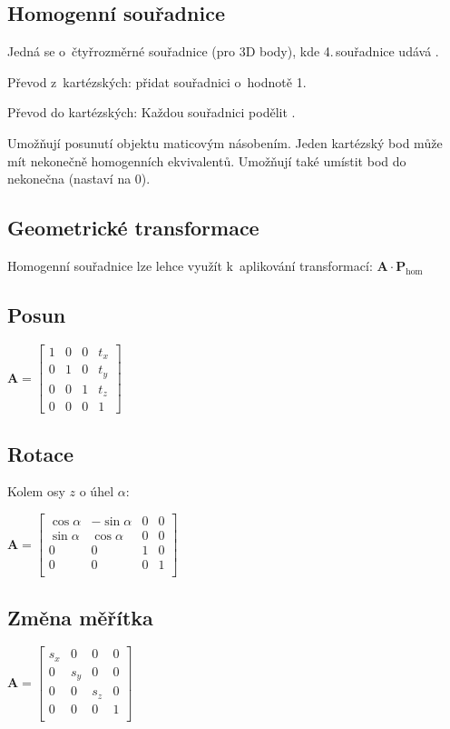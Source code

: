 \subsection{Homogenní souřadnice}
Jedná se o~čtyřrozměrné souřadnice (pro 3D body), kde 4.\,souřadnice udává .

Převod z~kartézských: přidat souřadnici o~hodnotě 1.

Převod do kartézských: Každou souřadnici podělit .

Umožňují posunutí objektu maticovým násobením. Jeden kartézský bod může mít nekonečně homogenních ekvivalentů. Umožňují také umístit bod do nekonečna (nastaví  na 0).

\subsection{Geometrické transformace}

Homogenní souřadnice lze lehce využít k~aplikování transformací: \(\mathbf{A}\cdot\mathbf{P}_\mathrm{hom}\)

\subsection{Posun}

\(\mathbf{A}=\begin{bmatrix}
    1 & 0 & 0 & t_x \\
    0 & 1 & 0 & t_y \\
    0 & 0 & 1 & t_z \\
    0 & 0 & 0 & 1
\end{bmatrix}\)

\subsection{Rotace}
Kolem osy \(z\) o úhel \(\alpha\):

\(\mathbf{A}=\begin{bmatrix}
    \cos \alpha & -\sin \alpha &0 & 0 \\
    \sin \alpha & \cos \alpha & 0 & 0 \\
    0 & 0 & 1 & 0 \\
    0 & 0 & 0 & 1 \\
\end{bmatrix}\)

\subsection{Změna  měřítka}
\(\mathbf{A}=\begin{bmatrix}
    s_x & 0 & 0 & 0 \\
    0 & s_y & 0 & 0 \\
    0 & 0 & s_z & 0 \\
    0 & 0 & 0 & 1\\
\end{bmatrix}\)

